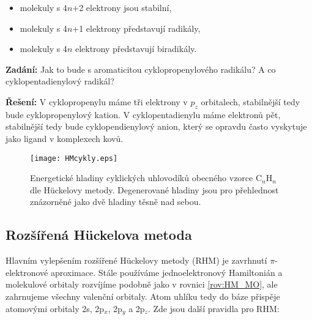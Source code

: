 \begin{itemize}
\item molekuly s 4$n$+2 elektrony jsou stabilní,
\item molekuly s 4$n$+1 elektrony představují radikály,
\item molekuly s 4$n$ elektrony představují biradikály.
\end{itemize}


\begin{priklad}
\textbf{Zadání:} Jak to bude s aromaticitou cyklopropenylového radikálu? A co cyklopentadienylový radikál?

\textbf{Řešení:} V cyklopropenylu máme tři elektrony v $p_z$ orbitalech, stabilnější tedy bude cyklopropenylový kation. V cyklopentadienylu máme elektronů pět, stabilnější tedy bude cyklopendienylový anion, který se opravdu často vyskytuje jako ligand v komplexech kovů.
\end{priklad}

\begin{figure}
\centering
\texttt{[image: HMcykly.eps]}
\caption[Energetické hladiny cyklických uhlovodíků]{Energetické hladiny cyklických uhlovodíků obecného vzorce C$_n$H$_n$ dle H\"{u}ckelovy metody. Degenerované hladiny jsou pro přehlednost znázorněné jako dvě hladiny těsně nad sebou.}
\label{obr:HMcykly}
\end{figure}
\bigskip



\subsection{Rozšířená H\"{u}ckelova metoda}

Hlavním vylepšením rozšířené H\"{u}ckelovy metody (RHM) je zavrhnutí $\pi$-elektronové aproximace.
Stále používáme jednoelektronový Hamiltonián a molekulové orbitaly rozvíjíme podobně jako v rovnici \eqref{rov:HM_MO}, ale zahrnujeme všechny valenční orbitaly. Atom uhlíku tedy do báze přispěje atomovými orbitaly 2s, 2p$_x$, 2p$_y$ a 2p$_z$. 
Zde jsou další pravidla pro RHM:

